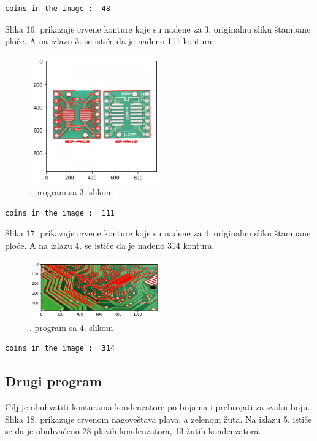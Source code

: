 \documentclass[fontsize=12bp, paper=a4]{scrarticle}
\begin{document}
\begin{lstlisting}[caption=1. program sa 2. slikom]
coins in the image :  48
\end{lstlisting}
Slika 16. prikazuje crvene konture koje su nađene za 3. originalnu sliku štampane ploče. A na izlazu 3. se ističe da je nađeno 111 kontura. 
\begin{figure}[h!]
    \centering
    \includegraphics[width=0.5\textwidth]{13.png}
    \caption{. program sa 3. slikom}
\end{figure} 

\begin{lstlisting}[caption=1. program sa 3. slikom]
coins in the image :  111
\end{lstlisting}

Slika 17. prikazuje crvene konture koje su nađene za 4. originalnu sliku štampane ploče. A na izlazu 4. se ističe da je nađeno 314 kontura. 

\begin{figure}[h!]
    \centering
    \includegraphics[width=0.5\textwidth]{14.png}
    \caption{. program sa 4. slikom}
\end{figure} 

\begin{lstlisting}[caption=1. program sa 4. slikom]
coins in the image :  314
\end{lstlisting}

\subsection*{Drugi program}
Cilj je obuhvatiti konturama kondenzatore po bojama i prebrojati za svaku boju. Slika 18. prikazuje crvenom nagoveštava plava, a zelenom žuta. Na izlazu 5. ističe se da je obuhvaćeno 28 plavih kondenzatora, 13 žutih kondenzatora.
\end{document}

